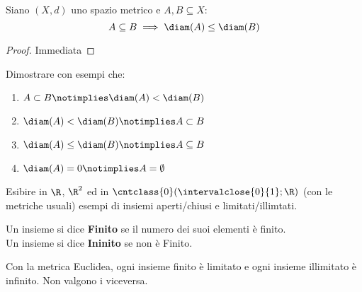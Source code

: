 \begin{proposition}
	Siano $(X,d)$ uno spazio metrico e $A,B\subseteq X$:
	\[A \subseteq B \implies \diam(A) \leq \diam(B)\]
	\begin{proof}
		Immediata %
	\end{proof}
\end{proposition}
\begin{exercise}
	Dimostrare con esempi che:
	\begin{enumerate}
		\item $A \subset B \notimplies \diam(A) < \diam(B)$
		\item $\diam(A) < \diam(B) \notimplies A \subset B$
		\item $\diam(A) \leq \diam(B) \notimplies A \subseteq B$
		\item $\diam(A) = 0 \notimplies A = \emptyset$ %
	\end{enumerate}
\end{exercise}
\begin{exercise}
	Esibire in $\R$, $\R^2$ ed in $\cntclass{0}(\intervalclose{0}{1}; \R)$ (con le metriche usuali) esempi di insiemi aperti/chiusi e limitati/illimtati.
\end{exercise}

\begin{definition}
	Un insieme si dice \textbf{Finito} se il numero dei suoi elementi è finito.\\
	Un insieme si dice \textbf{Ininito} se non è Finito.
\end{definition}
\begin{observation}
	Con la metrica Euclidea, ogni insieme finito è limitato e ogni insieme illimitato è infinito. Non valgono i viceversa.
\end{observation}

\newpage
